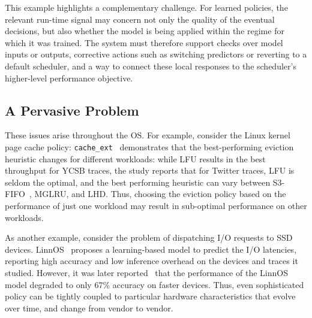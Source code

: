 This example highlights a complementary challenge. For learned policies, the relevant run-time signal may concern not only the quality of the eventual decisions, but also whether the model is being applied within the regime for which it was trained. The system must therefore support checks over model inputs or outputs, corrective actions such as switching predictors or reverting to a default scheduler, and a way to connect these local responses to the scheduler's higher-level performance objective.


\subsection{A Pervasive Problem}
These issues arise throughout the OS. For example, consider the Linux kernel page cache policy: {\tt cache_ext}~\cite{cache-ext-sosp25} demonstrates that the best-performing eviction heuristic changes for different workloads: while LFU results in the best throughput for YCSB traces, the study reports that for Twitter traces, LFU is seldom the optimal, and the best performing heuristic can vary between S3-FIFO~\cite{s3fifo-sigcomm}, MGLRU, and LHD.
Thus, choosing the eviction policy based on the performance of just one workload may result in sub-optimal performance on other workloads.

As another example, consider the problem of dispatching I/O requests to SSD devices.
LinnOS~\cite{linnos-osdi20} proposes a learning-based model to predict the I/O latencies, reporting high accuracy and low inference overhead on the devices and traces it studied.
However, it was later reported~\cite{heimdall-eurosys25} that the performance of the LinnOS model degraded to only 67\% accuracy on faster devices. %
Thus, even sophisticated policy can be tightly coupled to particular hardware characteristics that evolve over time, and change from vendor to vendor.




